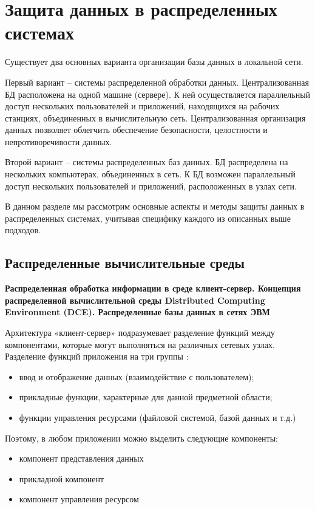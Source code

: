 \section{Защита данных в распределенных системах}

Существует два основных варианта организации базы данных в локальной сети.

Первый вариант – системы распределенной обработки данных. Централизованная БД расположена на одной машине (сервере). К ней осуществляется параллельный доступ нескольких пользователей и приложений, находящихся на рабочих станциях, объединенных в вычислительную сеть. Централизованная организация данных позволяет облегчить обеспечение безопасности, целостности и непротиворечивости данных.

Второй вариант – системы распределенных баз данных. БД распределена на нескольких компьютерах, объединенных в сеть. К БД возможен параллельный доступ нескольких пользователей и приложений, расположенных в узлах сети. \autocite{Sergeeva}

В данном разделе мы рассмотрим основные аспекты и методы защиты данных в распределенных системах, учитывая специфику каждого из описанных выше подходов.

\subsection{Распределенные вычислительные среды}

\textbf{Распределенная обработка информации в среде клиент-сервер.
Концепция распределенной вычислительной среды Distributed Computing Environment (DCE).
Распределенные базы данных в сетях ЭВМ}

Архитектура «клиент-сервер» подразумевает разделение функций между компонентами, которые могут выполняться на различных сетевых узлах.
Разделение функций приложения на три группы \autocite{4studClntSrv}:
\begin{itemize}
    \item ввод и отображение данных (взаимодействие с пользователем);
    \item прикладные функции, характерные для данной предметной области;
    \item функции управления ресурсами (файловой системой, базой данных и т.д.)
\end{itemize}

Поэтому, в любом приложении можно выделить следующие компоненты:
\begin{itemize}
    \item компонент представления данных
    \item прикладной компонент
    \item компонент управления ресурсом
\end{itemize}

